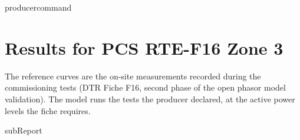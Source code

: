 {{ producercommand }}



    \section{Results for PCS RTE-F16 Zone 3}

    The reference curves are the on-site measurements recorded during the commissioning
    tests (DTR Fiche F16, second phase of the open phasor model validation). The model
    runs the tests the producer declared, at the active power levels the fiche requires.

    {{subReport}}
    \newpage

